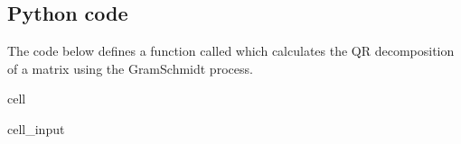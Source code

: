\documentclass[letterpaper,10pt,english]{jupyterBook}
\begin{document}
\subsection{Python code}
\label{\detokenize{6_Direct_methods/6.4_QR_decomposition:python-code}}
\sphinxAtStartPar
The code below defines a function called  which calculates the QR decomposition of a matrix  using the Gram\sphinxhyphen{}Schmidt process.

\begin{sphinxuseclass}{cell}\begin{sphinxVerbatimInput}

\begin{sphinxuseclass}{cell_input}
\begin{sphinxVerbatim}[commandchars=\\\{\}]
 
       
         
       
           
            \PYG{p}{[}\PYG{p}{]}  \PYG{p}{[}\PYG{p}{]} \PYG{p}{[}\PYG{p}{]}
            \PYG{p}{[}\PYG{p}{]}  \PYG{p}{[}\PYG{p}{]}  \PYG{p}{[}\PYG{p}{]}  \PYG{p}{[}\PYG{p}{]}
            
        \PYG{p}{[}\PYG{p}{]}  \PYG{p}{[}\PYG{p}{]}  \PYG{p}{[}\PYG{p}{]}
        \PYG{p}{[}\PYG{p}{]}  \PYG{p}{[}\PYG{p}{]}
        \PYG{p}{[}\PYG{p}{]}  \PYG{p}{[}\PYG{p}{]}  \PYG{p}{[}\PYG{p}{]}
    
      
\end{sphinxVerbatim}

\end{sphinxuseclass}\end{sphinxVerbatimInput}

\end{sphinxuseclass}
\end{document}
